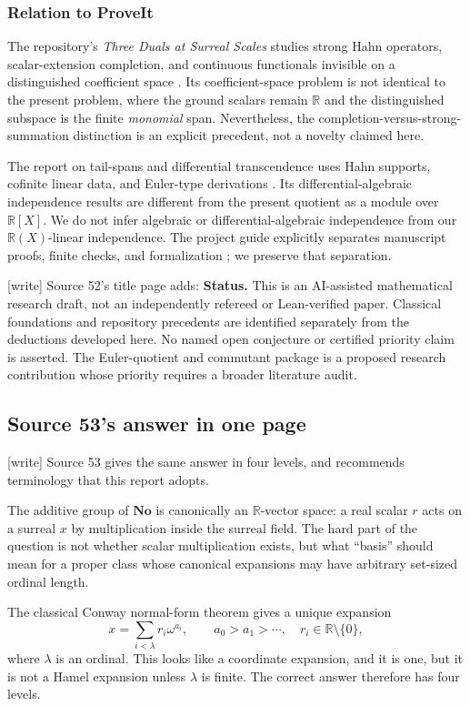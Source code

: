 \documentclass[11pt,letterpaper]{article}
\numberwithin{equation}{section}
\theoremstyle{definition}
\theoremstyle{remark}
\newcommand{\No}{\mathbf{No}}
\newcommand{\R}{\mathbb{R}}
\newcommand{\wtag}{\textup{[write]}}%
\begin{document}
\subsubsection{Relation to ProveIt}
The repository's \emph{Three Duals at Surreal Scales} studies strong Hahn operators, scalar-extension completion, and continuous functionals invisible on a distinguished coefficient space \cite{RepoDuals}. Its coefficient-space problem is not identical to the present problem, where the ground scalars remain $\R$ and the distinguished subspace is the finite \emph{monomial} span. Nevertheless, the completion-versus-strong-summation distinction is an explicit precedent, not a novelty claimed here.

The report on tail-spans and differential transcendence uses Hahn supports, cofinite linear data, and Euler-type derivations \cite{RepoTail}. Its differential-algebraic independence results are different from the present quotient as a module over $\R[X]$. We do not infer algebraic or differential-algebraic independence from our $\R(X)$-linear independence. The project guide explicitly separates manuscript proofs, finite checks, and formalization \cite{RepoGuide}; we preserve that separation.

\noindent\wtag{} Source 52's title page adds: \textbf{Status.} This is an
AI-assisted mathematical research draft, not an independently refereed or
Lean-verified paper. Classical foundations and repository precedents are
identified separately from the deductions developed here. No named open
conjecture or certified priority claim is asserted. The Euler-quotient and
commutant package is a proposed research contribution whose priority requires
a broader literature audit.

\subsection{Source 53's answer in one page}\label{rvs:w:subsec:intro53}

\wtag{} Source 53 gives the same answer in four levels, and recommends
terminology that this report adopts.

The additive group of $\No$ is canonically an $\R$-vector space: a real scalar
$r$ acts on a surreal $x$ by multiplication inside the surreal field. The hard
part of the question is not whether scalar multiplication exists, but what
``basis'' should mean for a proper class whose canonical expansions may have
arbitrary set-sized ordinal length.

The classical Conway normal-form theorem gives a unique expansion
\begin{equation}\label{rvs:cv:eq:normal-form-preview}
  x=\sum_{i<\lambda} r_i\omega^{a_i},
  \qquad a_0>a_1>\cdots,\quad r_i\in\R\setminus\{0\},
\end{equation}
where $\lambda$ is an ordinal. This looks like a coordinate expansion, and it is
one, but it is not a Hamel expansion unless $\lambda$ is finite. The correct
answer therefore has four levels.
\end{document}
